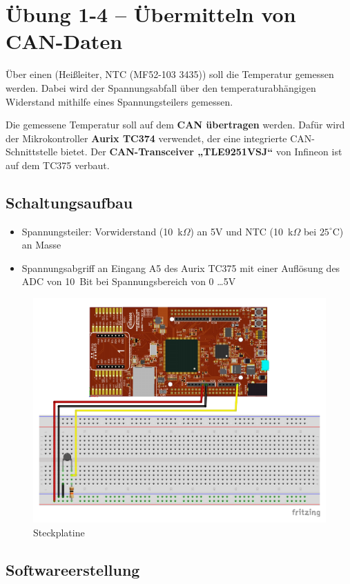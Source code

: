 \documentclass[
    fontsize=12pt,                      %
    paper=a4,                           %
    twoside=off,                       %
    DIV=15,                             %
    BCOR=12mm,                          %
    headings=normal,                    %
    headsepline=false,                   %
    footsepline=false,                  %
    headinclude=true,                   %
    footinclude=false,                  %
    toc=listof,                         %
    toc=bib,                            %
    chapterprefix=false,                %
    appendixprefix=false,               %
    numbers=noendperiod,                %
    captions=tableabove,                %
    footnotes=multiple,                 %
    bibliography=oldstyle,              %
    draft=false,                        %
]{scrreprt}
\begin{document}
\chapter*{Übung 1-4 -- Übermitteln von CAN-Daten}

Über einen  (Heißleiter, NTC (MF52-103 3435)) soll die Temperatur gemessen werden. Dabei wird der Spannungsabfall über den temperaturabhängigen Widerstand mithilfe eines Spannungsteilers gemessen.

\vskip 0.2cm
\noindent

Die gemessene Temperatur soll auf dem \textbf{CAN übertragen} werden. Dafür wird der Mikrokontroller \textbf{Aurix TC374} verwendet, der eine integrierte CAN-Schnittstelle bietet. Der \textbf{CAN-Transceiver „TLE9251VSJ“} von Infineon ist auf dem TC375 verbaut.

\vskip 0.2cm
\noindent


\vskip 0.5cm
\section*{Schaltungsaufbau} 
\begin{itemize}
\item Spannungsteiler: Vorwiderstand (10~k$\Omega$) an 5V und NTC (10~k$\Omega$ bei $25^\circ$C) an Masse
\item Spannungsabgriff an Eingang A5 des Aurix TC375 mit einer Auflösung des ADC von 10~Bit bei Spannungsbereich von 0 \dots 5V
\end{itemize}

\begin{figure}[H]
  \centering
  \includegraphics[width=0.45\linewidth]{Fritzing/Uebung_104_Steckplatine}
  \caption{Steckplatine}
\end{figure}

\section*{Softwareerstellung} 
\end{document}
